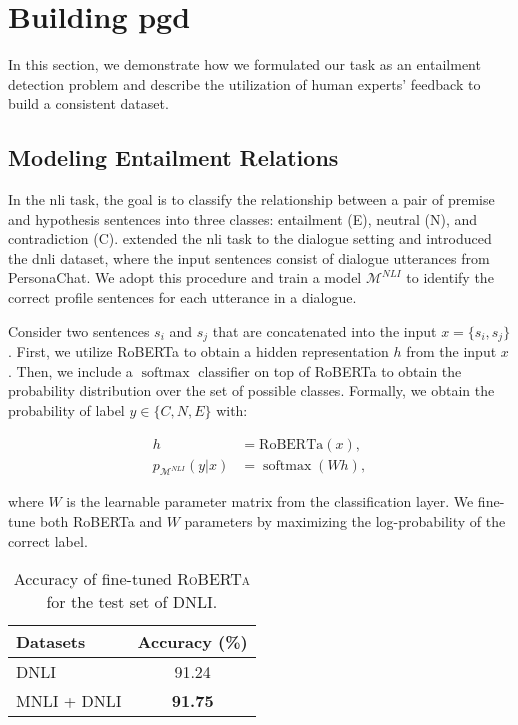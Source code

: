 \documentclass[11pt]{article}
\DeclareMathOperator*{\softmax}{softmax}
\begin{document}
\section{Building \gls*{pgd}}

In this section, we demonstrate how we formulated our task as an entailment detection problem and describe the utilization of human experts' feedback to build a consistent dataset.

\subsection{Modeling Entailment Relations}\label{sec:model}

In the \gls*{nli} task, the goal is to classify the relationship between a pair of premise and hypothesis sentences into three classes: entailment (E), neutral (N), and contradiction (C). \citet{DNLI} extended the \gls*{nli} task to the dialogue setting and introduced the \gls*{dnli} dataset, where the input sentences consist of dialogue utterances from PersonaChat.
We adopt this procedure and train a model \(\mathcal{M}^{NLI}\) to identify the correct profile sentences for each utterance in a dialogue.

Consider two sentences \(s_i\) and \(s_j\) that are concatenated into the input \(x= \{s_i, s_j\}\).
First, we utilize RoBERTa \cite{ROBERTA} to obtain a hidden representation \(h\) from the input \(x\).
Then, we include a \(\softmax\) classifier on top of RoBERTa to obtain the probability distribution over the set of possible classes.
Formally, we obtain the probability of label \(y \in \{C, N, E\}\) with:

\begin{equation}
    \begin{split}
    h &= \text{RoBERTa}(x), \\
    p_{\mathcal{M}^{NLI}}(y|x) &= \softmax(Wh),
    \end{split}
\end{equation}

where \(W\) is the learnable parameter matrix from the classification layer. 
We fine-tune both RoBERTa and \(W\) parameters by maximizing the log-probability of the correct label.

\begin{table}[ht]
    \centering
    \begin{tabular}{lc}
    \hline
    \textbf{Datasets} & \textbf{Accuracy (\%)}\\
    \hline
    DNLI & 91.24 \\
    MNLI + DNLI & \textbf{91.75} \\
    \hline
    \end{tabular}
\caption{Accuracy of fine-tuned \textsc{RoBERTa} for the test set of DNLI.}
\label{tab:acc-dnli}
\end{table}
\end{document}
